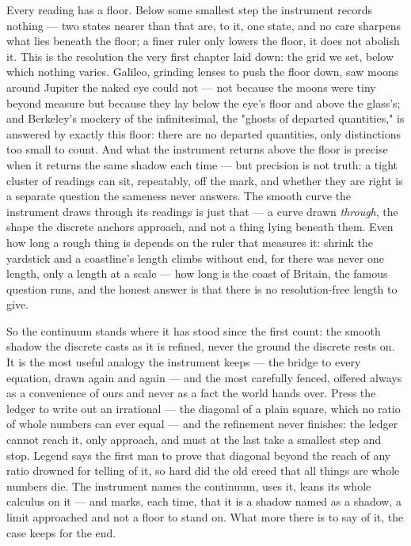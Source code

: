 Every reading has a floor. Below some smallest step the instrument records nothing --- two states nearer than
that are, to it, one state, and no care sharpens what lies beneath the floor; a finer ruler only lowers the
floor, it does not abolish it. This is the resolution the very first chapter laid down: the grid we set, below
which nothing varies. Galileo, grinding lenses to push the floor down, saw moons around Jupiter the naked eye
could not --- not because the moons were tiny beyond measure but because they lay below the eye's floor and
above the glass's; and Berkeley's mockery of the infinitesimal, the "ghosts of departed quantities," is answered
by exactly this floor: there are no departed quantities, only distinctions too small to count. And what the instrument returns above the floor is precise when it returns the same shadow
each time --- but precision is not truth: a tight cluster of readings can sit, repeatably, off the mark, and
whether they are right is a separate question the sameness never answers. The smooth curve the instrument draws
through its readings is just that --- a curve drawn \emph{through}, the shape the discrete anchors approach, and
not a thing lying beneath them. Even how long a rough thing is depends on the ruler that measures it: shrink the
yardstick and a coastline's length climbs without end, for there was never one length, only a length at a scale
--- how long is the coast of Britain, the famous question runs, and the honest answer is that there is no
resolution-free length to give.

So the continuum stands where it has stood since the first count: the smooth shadow the discrete casts as it is
refined, never the ground the discrete rests on. It is the most useful analogy the instrument keeps --- the
bridge to every equation, drawn again and again --- and the most carefully fenced, offered always as a
convenience of ours and never as a fact the world hands over. Press the ledger to write out an irrational ---
the diagonal of a plain square, which no ratio of whole numbers can ever equal --- and the refinement never
finishes: the ledger cannot reach it, only approach, and must at the last take a smallest step and stop. Legend says the
first man to prove that diagonal beyond the reach of any ratio drowned for telling of it, so hard did the old
creed that all things are whole numbers die. The
instrument names the continuum, uses it, leans its whole calculus on it --- and marks, each time, that it is a
shadow named as a shadow, a limit approached and not a floor to stand on. What more there is to say of it, the
case keeps for the end.

